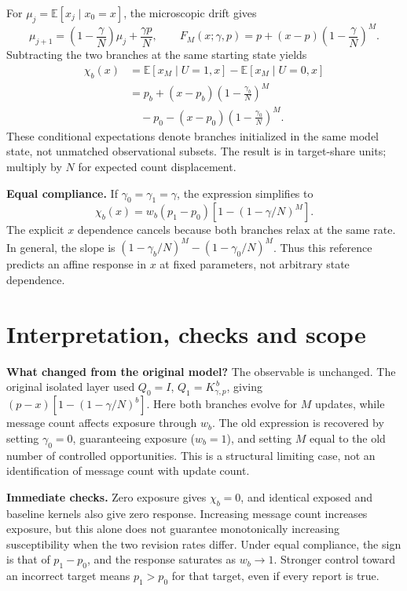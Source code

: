 \documentclass[11pt,a4paper]{article}
\begin{document}
For $\mu_j=\mathbb E[x_j\mid x_0=x]$, the microscopic drift gives
\begin{equation}
 \mu_{j+1}=\left(1-\frac{\gamma}{N}\right)\mu_j+\frac{\gamma p}{N},
 \qquad
 F_M(x;\gamma,p)=p+(x-p)\left(1-\frac{\gamma}{N}\right)^M.
\end{equation}
Subtracting the two branches at the same starting state yields
\begin{equation}
\boxed{\begin{aligned}
 \chi_b(x)&=\mathbb E[x_M\mid U=1,x]-\mathbb E[x_M\mid U=0,x]\\
 &=p_b+(x-p_b)\left(1-\frac{\gamma_b}{N}\right)^M\\
 &\quad-p_0-(x-p_0)\left(1-\frac{\gamma_0}{N}\right)^M.
\end{aligned}}
\label{eq:chi}
\end{equation}
These conditional expectations denote branches initialized in the same model state, not unmatched observational subsets. The result is in target-share units; multiply by $N$ for expected count displacement.

\textbf{Equal compliance.} If $\gamma_0=\gamma_1=\gamma$, the expression simplifies to
\begin{equation}
 \boxed{\chi_b(x)=w_b(p_1-p_0)\left[1-(1-\gamma/N)^M\right].}
\end{equation}
The explicit $x$ dependence cancels because both branches relax at the same rate. In general, the slope is $(1-\gamma_b/N)^M-(1-\gamma_0/N)^M$. Thus this reference predicts an affine response in $x$ at fixed parameters, not arbitrary state dependence.

\newpage
\section{Interpretation, checks and scope}
\textbf{What changed from the original model?} The observable is unchanged. The original isolated layer used $Q_0=I$, $Q_1=K_{\gamma,p}^{\,b}$, giving $(p-x)[1-(1-\gamma/N)^b]$. Here both branches evolve for $M$ updates, while message count affects exposure through $w_b$. The old expression is recovered by setting $\gamma_0=0$, guaranteeing exposure ($w_b=1$), and setting $M$ equal to the old number of controlled opportunities. This is a structural limiting case, not an identification of message count with update count.

\textbf{Immediate checks.} Zero exposure gives $\chi_b=0$, and identical exposed and baseline kernels also give zero response. Increasing message count increases exposure, but this alone does not guarantee monotonically increasing susceptibility when the two revision rates differ. Under equal compliance, the sign is that of $p_1-p_0$, and the response saturates as $w_b\to1$. Stronger control toward an incorrect target means $p_1>p_0$ for that target, even if every report is true.
\end{document}
